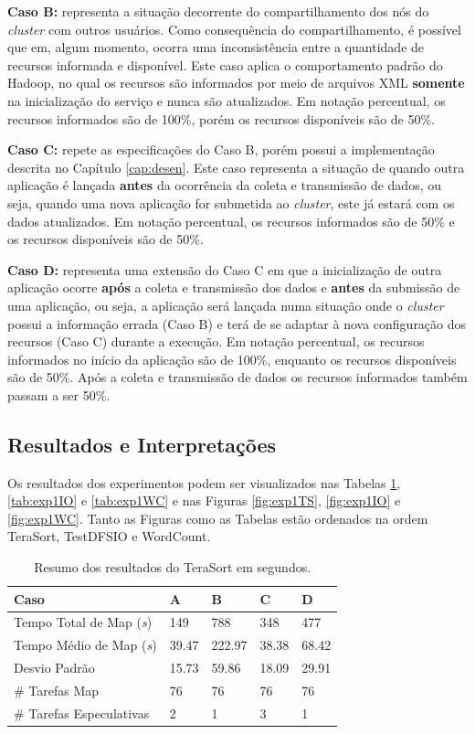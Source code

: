 \textbf{Caso B:} representa a situação decorrente do compartilhamento dos nós do \textit{cluster} com outros usuários. Como consequência do compartilhamento, é possível que em, algum momento, ocorra uma inconsistência entre a quantidade de recursos informada e disponível. Este caso aplica o comportamento padrão do Hadoop, no qual os recursos são informados por meio de arquivos XML \textbf{somente} na inicialização do serviço e nunca são atualizados. Em notação percentual, os recursos informados são de 100\%, porém os recursos disponíveis são de 50\%.

\textbf{Caso C:} repete as especificações do Caso B, porém possui a implementação descrita no Capítulo \ref{cap:desen}. Este caso representa a situação de quando outra aplicação é lançada \textbf{antes} da ocorrência da coleta e transmissão de dados, ou seja, quando uma nova aplicação for submetida ao \textit{cluster}, este já estará com os dados atualizados. Em notação percentual, os recursos informados são de 50\% e os recursos disponíveis são de 50\%.

\textbf{Caso D:} representa uma extensão do Caso C em que a inicialização de outra aplicação ocorre \textbf{após} a coleta e transmissão dos dados e \textbf{antes} da submissão de uma aplicação, ou seja, a aplicação será lançada numa situação onde o \textit{cluster} possui a informação errada (Caso B) e terá de se adaptar à nova configuração dos recursos (Caso C) durante a execução. Em notação percentual, os recursos informados no início da aplicação são de 100\%, enquanto os recursos disponíveis são de 50\%. Após a coleta e transmissão de dados os recursos informados também passam a ser 50\%.

\subsection{Resultados e Interpretações}
Os resultados dos experimentos podem ser visualizados nas Tabelas \ref{tab:exp1TS}, \ref{tab:exp1IO} e \ref{tab:exp1WC} e nas Figuras \ref{fig:exp1TS}, \ref{fig:exp1IO} e \ref{fig:exp1WC}. Tanto as Figuras como as Tabelas estão ordenados na ordem TeraSort, TestDFSIO e WordCount. 

\begin{table}[h!]
	\caption{Resumo dos resultados do TeraSort em segundos.} \label{tab:exp1TS}
	\begin{tabular*}{\hsize}{lllll} %
		\textbf{Caso} & \textbf{A} & \textbf{B} & \textbf{C} & \textbf{D}\\
		\hline
		Tempo Total de Map ({\it{s}}) & 149 & 788 & 348 & 477 \\
		Tempo Médio de Map ({\it{s}}) & 39.47 & 222.97 & 38.38 & 68.42 \\
		Desvio Padrão & 15.73 & 59.86 & 18.09 & 29.91 \\
		\# Tarefas Map & 76 & 76 & 76 & 76 \\
		\# Tarefas Especulativas & 2 & 1 & 3 & 1 \\
	\end{tabular*}
\end{table}

